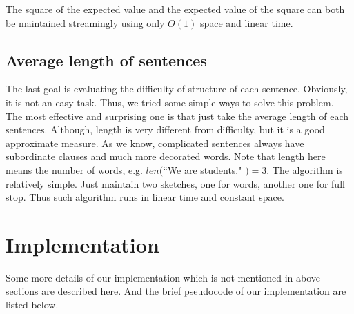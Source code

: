 \documentclass{article}
\begin{document}
		The square of the expected value and the expected value of the square can both be maintained streamingly using only $O(1)$ space and linear
		time.

	\subsection{Average length of sentences}
		The last goal is evaluating the difficulty of structure of each sentence. Obviously, it is not an easy task. Thus, we tried
		some simple ways to solve this problem. The most effective and surprising one is that just take the average length of each sentences.
	\newline
	\newline
		Although, length is very different from difficulty, but it is a good approximate measure. As we know, complicated sentences always
		have subordinate clauses and much more decorated words. Note that length here means the number of words, e.g. $len($``We are students."
		$) = 3$.
	\newline
	\newline
		The algorithm is relatively simple. Just maintain two sketches, one for words, another one for full stop. Thus such algorithm runs
		in linear time and constant space.

\section{Implementation}
		Some more details of our implementation which is not mentioned in above sections are described here. And the brief pseudocode of
		our implementation are listed below.
\end{document}
